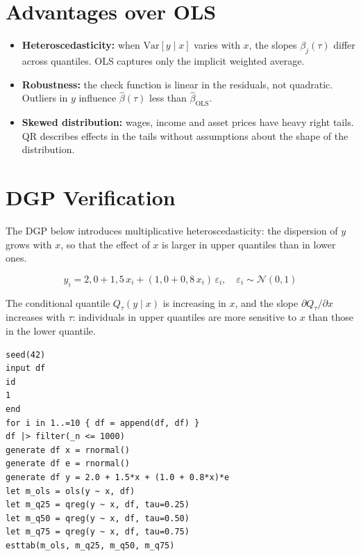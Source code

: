 \section{Advantages over OLS}

\begin{itemize}
  \item \textbf{Heteroscedasticity:} when $\mathrm{Var}[y \mid x]$ varies
        with $x$, the slopes $\beta_j(\tau)$ differ across quantiles. OLS
        captures only the implicit weighted average.

  \item \textbf{Robustness:} the check function is linear in the residuals, not
        quadratic. Outliers in $y$ influence $\hat\beta(\tau)$
        less than $\hat\beta_{\mathrm{OLS}}$.

  \item \textbf{Skewed distribution:} wages, income and asset prices
        have heavy right tails. QR describes effects in the tails without
        assumptions about the shape of the distribution.
\end{itemize}

\section{DGP Verification}

The DGP below introduces multiplicative heteroscedasticity: the dispersion
of $y$ grows with $x$, so that the effect of $x$ is larger in upper quantiles
than in lower ones.

\[
  y_i = 2{,}0 + 1{,}5\,x_i + (1{,}0 + 0{,}8\,x_i)\,\varepsilon_i,
  \quad \varepsilon_i \sim \mathcal{N}(0,1)
\]

The conditional quantile $Q_\tau(y \mid x)$ is increasing in $x$, and the
slope $\partial Q_\tau / \partial x$ increases with $\tau$: individuals
in upper quantiles are more sensitive to $x$ than those in the lower quantile.

\begin{lstlisting}[caption={Heteroscedastic DGP --- OLS vs.\ four quantiles}]
seed(42)
input df
id
1
end
for i in 1..=10 { df = append(df, df) }
df |> filter(_n <= 1000)
generate df x = rnormal()
generate df e = rnormal()
generate df y = 2.0 + 1.5*x + (1.0 + 0.8*x)*e
let m_ols = ols(y ~ x, df)
let m_q25 = qreg(y ~ x, df, tau=0.25)
let m_q50 = qreg(y ~ x, df, tau=0.50)
let m_q75 = qreg(y ~ x, df, tau=0.75)
esttab(m_ols, m_q25, m_q50, m_q75)
\end{lstlisting}

